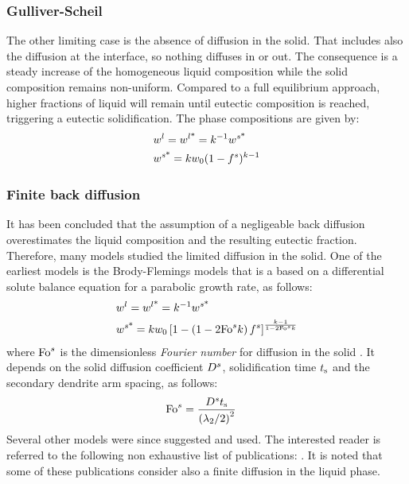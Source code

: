 \subsubsection*{Gulliver-Scheil}
The other limiting case is the absence of diffusion in the solid. That includes also the diffusion at the interface, 
so nothing diffuses in or out. The consequence is a steady increase of the homogeneous liquid composition while the solid composition remains non-uniform.
Compared to a full equilibrium approach, higher fractions of liquid will remain until eutectic composition is reached, 
triggering a eutectic solidification. The phase compositions are given by:
\begin{align}
\label{eq:scheil}
& {w}^l= {w}^{l \text{*}}  = k^{-1} {w}^{s \text{*}}  \\
& {w}^{s \text{*}} = k {w}_0 (1-{f^s})^{k-1}
\end{align}
%
\subsubsection*{Finite back diffusion}
It has been concluded that the assumption of a negligeable back diffusion overestimates the liquid composition
and the resulting eutectic fraction. Therefore, many models studied the limited diffusion in the solid. 
One of the earliest models is the Brody-Flemings models \citep{khan_influence_2014} that is a based on a differential solute balance equation for a parabolic growth rate, as follows:
\begin{align}
\label{eq:brodyflemings}
& {w}^l= {w}^{l \text{*}}  = k^{-1}  {w}^{s \text{*}}  \\
& {w}^{s \text{*}} = k {w}_0 \left[  1 - \left(  1 - 2 \text{Fo}^s k  \right) {f^s}  \right]^{\frac{k-1}{1 - 2 \text{Fo}^s k }}
\end{align}
where $\text{Fo}^s$ is the dimensionless \emph{Fourier number} for diffusion in the solid \citep{dantzig_solidification_2009}. It depends on the 
solid diffusion coefficient $D^s$, solidification time $t_\text{s}$ and the secondary dendrite arm spacing, as follows: 
\begin{align}
\label{eq:fouriersolid}
& \text{Fo}^s = \frac{D^s t_\text{s}}{\left( {\lambda}_{2} / 2 \right)^2}
\end{align}
Several other models were since suggested and used. The interested reader is referred to the following non 
exhaustive list of publications: \citet{clyne_solute_1981,kobayashi_solute_1988,ni_volume-averaged_1991,wang_multiphase_1993,
combeau_modeling_1996,martorano_solutal_2003,tourret_generalized_2009}. It is noted that some of these publications consider 
also a finite diffusion in the liquid phase.
%
%
